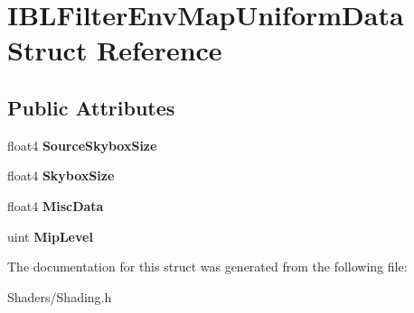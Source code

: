 \hypertarget{structIBLFilterEnvMapUniformData}{}\section{I\+B\+L\+Filter\+Env\+Map\+Uniform\+Data Struct Reference}
\label{structIBLFilterEnvMapUniformData}
\subsection*{Public Attributes}
\begin{DoxyCompactItemize}
\item 
\mbox{\label{structIBLFilterEnvMapUniformData_a77278a2a8f1ad6cfaf81803c93f29bd5}} 
float4 {\bfseries Source\+Skybox\+Size}
\item 
\mbox{\label{structIBLFilterEnvMapUniformData_aa397bc9df88afc24ec30965c36952333}} 
float4 {\bfseries Skybox\+Size}
\item 
\mbox{\label{structIBLFilterEnvMapUniformData_a7b6a706fd009ee2bb9adfec06454cbb3}} 
float4 {\bfseries Misc\+Data}
\item 
\mbox{\label{structIBLFilterEnvMapUniformData_a2c07e5e4ea7ab91593719bed0206c0fd}} 
uint {\bfseries Mip\+Level}
\end{DoxyCompactItemize}


The documentation for this struct was generated from the following file\+:\begin{DoxyCompactItemize}
\item 
Shaders/Shading.\+h\end{DoxyCompactItemize}
